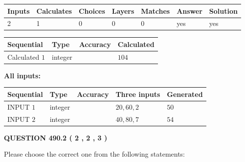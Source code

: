 \documentclass[12pt]{article}
\begin{document}
 
\noindent{}
 
 

 
   
   
   
   
\noindent\begin{tabular}{|l|l|l|l|l|l|l|}
 \hline
Inputs & Calculates & Choices & Layers & Matches & Answer & Solution \\ \hline
 2  & 
 1  & 
 0
  & 
 0  & 
 0  & 
  yes & 
  yes 
  \\ \hline
 \end{tabular}
   
   
   
   
\noindent{}
   
   
  
  
\noindent\begin{tabular}{|l|l|l|l|}
\hline
 Sequential & Type & Accuracy & Calculated \\ 
\hline
 
 
  Calculated $  1 $ & integer &  & 
  $ 104 $ 
 \\  \hline  
 \end{tabular}
   
   
   
   
\noindent\vspace{0.1in}\hspace{-0.08in} {\textbf{\Large{All inputs: }}}
   
   
  
  
\noindent\begin{tabular}{|l|l|l|l|l|}
\hline
 Sequential & Type & Accuracy & Three inputs & Generated \\ 
\hline
 
 
  INPUT $  1 $ & integer &  & $
 20
 , 
 60
 , 
 2
 $ & $ 50 $ 
 \\  \hline  
 
 
  INPUT $  2 $ & integer &  & $
 40
 , 
 80
 , 
 7
 $ & $ 54 $ 
 \\  \hline  
 \end{tabular}
   
   
  
\vspace{0.2in}
  
{\textbf{\Large{QUESTION
490.2 
 ( 2 , 2 , 3 )
}}}
  
  
Please choose the correct one from the following statements:
 
\end{document}
